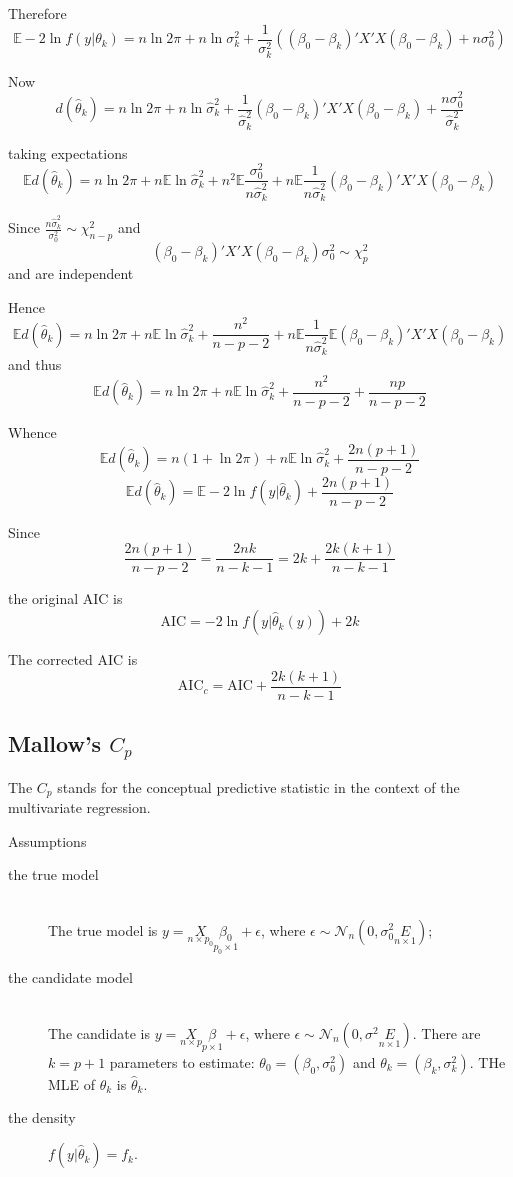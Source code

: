 \documentclass[a4paper]{article}
\newcommand{\brac}[1]{{\left ( #1 \right )}}
\newcommand{\induc}[1]{{\left . #1 \right \vert}}
\newcommand{\Ncal}{\mathcal{N}}
\newcommand{\Ex}[0]{{\mathbb{E}}}
\begin{document}
Therefore 
\[\Ex-2\ln f\brac{\induc{y}\theta_k} = n \ln 2\pi + n\ln \sigma^2_k + \frac{1}{\sigma^2_k} \brac{ \brac{\beta_0-\beta_k}'X'X\brac{\beta_0-\beta_k} + n\sigma_0^2 }\]

Now 
\[d\brac{\hat{\theta}_k} = n \ln 2\pi + n\ln \hat{\sigma}^2_k + \frac{1}{\hat{\sigma}^2_k}\brac{\beta_0-\beta_k}'X'X\brac{\beta_0-\beta_k} + \frac{n\sigma_0^2}{\hat{\sigma}^2_k}\]

taking expectations
\[\Ex d\brac{\hat{\theta}_k} = n \ln 2\pi + n\Ex \ln \hat{\sigma}^2_k + n^2\Ex \frac{\sigma_0^2}{n\hat{\sigma}^2_k} + n \Ex \frac{1}{n\hat{\sigma}^2_k}\brac{\beta_0-\beta_k}'X'X\brac{\beta_0-\beta_k}\]

Since $\frac{n\hat{\sigma}^2_k}{\sigma_0^2} \sim \chi^2_{n-p}$ and 
\[\brac{\beta_0-\beta_k}'X'X\brac{\beta_0-\beta_k}{\sigma_0^2} \sim \chi^2_p\]
and are independent

Hence
\[\Ex d\brac{\hat{\theta}_k} = n \ln 2\pi + n\Ex \ln \hat{\sigma}^2_k + \frac{n^2}{n-p-2} + n \Ex \frac{1}{n\hat{\sigma}^2_k} \Ex \brac{\beta_0-\beta_k}'X'X\brac{\beta_0-\beta_k}\]
and thus 
\[\Ex d\brac{\hat{\theta}_k} = n \ln 2\pi + n\Ex \ln \hat{\sigma}^2_k + \frac{n^2}{n-p-2} + \frac{n p}{n-p-2} \]

Whence 
\[\Ex d\brac{\hat{\theta}_k} = n \brac{1+\ln 2\pi} + n\Ex \ln \hat{\sigma}^2_k + \frac{2n(p+1)}{n-p-2}\]
\[\Ex d\brac{\hat{\theta}_k} = \Ex -2 \ln f\brac{\induc{y}\hat{\theta}_k} + \frac{2n(p+1)}{n-p-2}\]

Since 
\[\frac{2n(p+1)}{n-p-2} = \frac{2nk}{n-k-1} = 2k + \frac{2k(k+1)}{n-k-1}\]

the original AIC is
\[\text{AIC} = -2 \ln f\brac{\induc{y}\hat{\theta}_k(y)} + 2k\]

The corrected AIC is 
\[\text{AIC}_c = \text{AIC} + \frac{2k(k+1)}{n-k-1}\]


\subsection{Mallow's $C_p$} %
\label{sub:mallows_cp}

The $C_p$ stands for the conceptual predictive statistic in the context of the multivariate regression.

Assumptions \begin{description}
	\item[the true model]\hfill\\
	The true model is $y = \underset{n\times p_0}{X}\underset{p_0\times 1}{\beta_0} + \epsilon$, where $\epsilon \sim \Ncal_n\brac{0,\sigma_0^2 \underset{n\times 1}{E}}$;
	\item[the candidate model] \hfill\\
	The candidate is $y = \underset{n\times p}{X}\underset{p\times 1}{\beta} + \epsilon$, where $\epsilon \sim \Ncal_n\brac{0,\sigma^2 \underset{n\times 1}{E}}$.
	There are $k=p+1$ parameters to estimate: $\theta_0 = \brac{\beta_0,\sigma_0^2}$ and $\theta_k = \brac{\beta_k,\sigma_k^2}$. THe MLE of $\theta_k$ is $\hat{\theta}_k$.
	\item[the density] $f\brac{\induc{y}\hat{\theta}_k} = f_k$.
\end{description}
\end{document}
